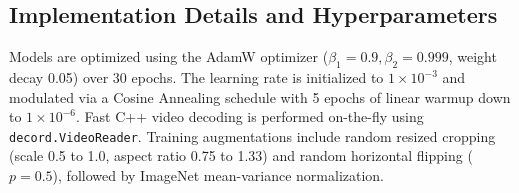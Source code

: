 \subsection{Implementation Details and Hyperparameters}
Models are optimized using the AdamW optimizer ($\beta_1=0.9, \beta_2=0.999$, weight decay 0.05) over 30 epochs. The learning rate is initialized to $1 \times 10^{-3}$ and modulated via a Cosine Annealing schedule with 5 epochs of linear warmup down to $1 \times 10^{-6}$. Fast C++ video decoding is performed on-the-fly using \texttt{decord.VideoReader}. Training augmentations include random resized cropping (scale 0.5 to 1.0, aspect ratio 0.75 to 1.33) and random horizontal flipping ($p=0.5$), followed by ImageNet mean-variance normalization.
